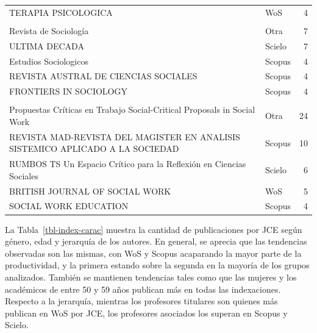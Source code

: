 \documentclass[
  spanish,
  a4paper,
  oneside]{scrbook}
\begin{document}
\begin{table}
{\begin{tabular}[t]{>{\raggedright\arraybackslash}p{11cm}lr}
\hspace{1em}TERAPIA PSICOLOGICA & WoS & 4\\
\addlinespace[0.3em]
\multicolumn{3}{l}{\textbf{Sociología}}\\
\hspace{1em}Revista de Sociología & Otra & 7\\
\hspace{1em}ULTIMA DECADA & Scielo & 7\\
\hspace{1em}Estudios Sociologicos & Scopus & 4\\
\hspace{1em}REVISTA AUSTRAL DE CIENCIAS SOCIALES & Scopus & 4\\
\hspace{1em}FRONTIERS IN SOCIOLOGY & Scopus & 4\\
\addlinespace[0.3em]
\multicolumn{3}{l}{\textbf{Trabajo social}}\\
\hspace{1em}Propuestas Críticas en Trabajo Social-Critical Proposals in Social Work & Otra & 24\\
\hspace{1em}REVISTA MAD-REVISTA DEL MAGISTER EN ANALISIS SISTEMICO APLICADO A LA SOCIEDAD & Scopus & 10\\
\hspace{1em}RUMBOS TS Un Espacio Crítico para la Reflexión en Ciencias Sociales & Scielo & 6\\
\hspace{1em}BRITISH JOURNAL OF SOCIAL WORK & WoS & 5\\
\hspace{1em}SOCIAL WORK EDUCATION & Scopus & 4\\
\bottomrule
\end{tabular}

}

\end{table}%

La Tabla~\ref{tbl-index-carac} muestra la cantidad de publicaciones por
JCE según género, edad y jerarquía de los autores. En general, se
aprecia que las tendencias observadas son las mismas, con WoS y Scopus
acaparando la mayor parte de la productividad, y la primera estando
sobre la segunda en la mayoría de los grupos analizados. También se
mantienen tendencias tales como que las mujeres y los académicos de
entre 50 y 59 años publican más en todas las indexaciones. Respecto a la
jerarquía, mientras los profesores titulares son quienes más publican en
WoS por JCE, los profesores asociados los superan en Scopus y Scielo.
\end{document}
